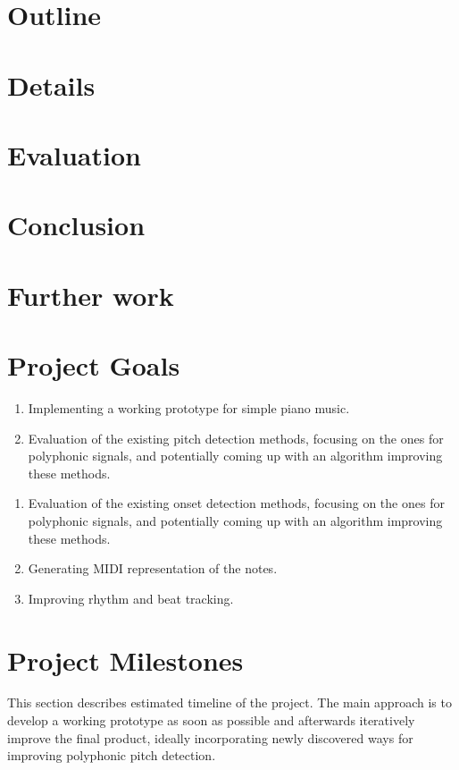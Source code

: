 \documentclass[11pt]{article} %
\begin{document}
\section{Outline}

\section{Details}

\section{Evaluation}

\section{Conclusion}

\section{Further work}

\section{Project Goals}

\begin{enumerate}
\item Implementing a working prototype for simple piano music.
\item Evaluation of the existing pitch detection methods, focusing on the ones for polyphonic signals, and potentially coming up with an algorithm improving these methods.
\end{enumerate}
\begin{enumerate}
\item Evaluation of the existing onset detection methods, focusing on the ones for polyphonic signals, and potentially coming up with an algorithm improving these methods.
\item Generating MIDI representation of the notes.
\item Improving rhythm and beat tracking.
\end{enumerate}

\section{Project Milestones}
This section describes estimated timeline of the project. The main approach is to develop a working prototype as soon as possible and afterwards iteratively improve the final product, ideally incorporating newly discovered ways for improving polyphonic pitch detection. 
\end{document}
